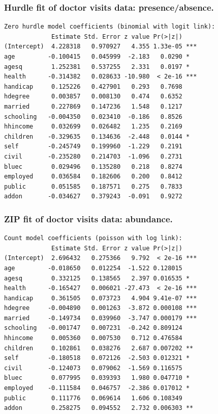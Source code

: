 \documentclass{beamer}
\begin{document}
\begin{frame}[fragile]
\frametitle{Hurdle fit of doctor visits data: presence/absence.}

{\scriptsize
\begin{verbatim}
Zero hurdle model coefficients (binomial with logit link):
             Estimate Std. Error z value Pr(>|z|)    
(Intercept)  4.228318   0.970927   4.355 1.33e-05 ***
age         -0.100415   0.045999  -2.183   0.0290 *  
agesq        1.252381   0.537255   2.331   0.0197 *  
health      -0.314382   0.028633 -10.980  < 2e-16 ***
handicap     0.125226   0.427901   0.293   0.7698    
hdegree      0.003857   0.008130   0.474   0.6352    
married      0.227869   0.147236   1.548   0.1217    
schooling   -0.004350   0.023410  -0.186   0.8526    
hhincome     0.032699   0.026482   1.235   0.2169    
children    -0.329635   0.134636  -2.448   0.0144 *  
self        -0.245749   0.199960  -1.229   0.2191    
civil       -0.235280   0.214703  -1.096   0.2731    
bluec        0.029496   0.135280   0.218   0.8274    
employed     0.036584   0.182606   0.200   0.8412    
public       0.051585   0.187571   0.275   0.7833    
addon       -0.034627   0.379243  -0.091   0.9272    
\end{verbatim}
}

\end{frame}

\begin{frame}[fragile]
\frametitle{ZIP fit of doctor visits data: abundance.}

{\scriptsize
\begin{verbatim}
Count model coefficients (poisson with log link):
             Estimate Std. Error z value Pr(>|z|)    
(Intercept)  2.696432   0.275366   9.792  < 2e-16 ***
age         -0.018650   0.012254  -1.522 0.128015    
agesq        0.332125   0.138565   2.397 0.016535 *  
health      -0.165427   0.006021 -27.473  < 2e-16 ***
handicap     0.361505   0.073723   4.904 9.41e-07 ***
hdegree     -0.004890   0.001263  -3.872 0.000108 ***
married     -0.149734   0.039960  -3.747 0.000179 ***
schooling   -0.001747   0.007231  -0.242 0.809124    
hhincome     0.005360   0.007530   0.712 0.476584    
children     0.102861   0.038276   2.687 0.007202 ** 
self        -0.180518   0.072126  -2.503 0.012321 *  
civil       -0.124073   0.079062  -1.569 0.116575    
bluec        0.077995   0.039393   1.980 0.047710 *  
employed    -0.111584   0.046757  -2.386 0.017012 *  
public       0.111776   0.069614   1.606 0.108349    
addon        0.258275   0.094552   2.732 0.006303 ** 
\end{verbatim}
}

\end{frame}
\end{document}
